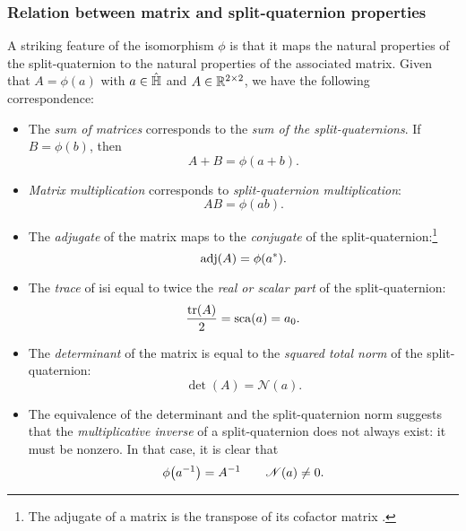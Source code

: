 \subsubsection{Relation between matrix and split-quaternion properties} 
A striking feature of the isomorphism \(\phi\) is that it maps the natural properties of the split-quaternion to the natural properties of the associated matrix. Given that \(A = \phi(a)\) with \(a \in \hat{\mathbb{H}}\) and \(A \in \mathbb{R}^{2\times2}\), we have the following correspondence: 
\begin{itemize}
    \item The \emph{sum of matrices} corresponds to the \emph{sum of the split-quaternions}. If \(B = \phi(b)\), then
        \begin{equation}
            A + B = \phi(a + b).
        \end{equation}
    \item \emph{Matrix multiplication} corresponds to \emph{split-quaternion multiplication}:
        \begin{equation}
              AB = \phi(ab).
        \end{equation}
    \item The \emph{adjugate} of the matrix maps to the \emph{conjugate} of the split-quaternion:\footnote
        {The adjugate of a matrix is the transpose of its cofactor matrix \cite{Verhaegen2007}.}
        \begin{equation}
             \operatorname{adj}(A) = \phi(a^*).
        \end{equation}
    \item The \emph{trace} of isi equal to twice the \emph{real or scalar part} of the split-quaternion:
        \begin{equation}
             \frac{\trace(A)}{2} = \scapart{a} = a_0.
        \end{equation}
    \item The \emph{determinant} of the matrix is equal to the \emph{squared total norm} of the split-quaternion:
        \begin{equation}
              \det(A) = \mathscr{N}(a).
        \end{equation}
    \item The equivalence of the determinant and the split-quaternion norm suggests that the \emph{multiplicative inverse} of a split-quaternion does not always exist: it must be nonzero. In that case, it is clear that
        \begin{equation}
             \phi\qty(a^{-1}) = A^{-1} \qquad \mathscr{N}(a) \neq 0.

\end{equation}
\end{itemize}
